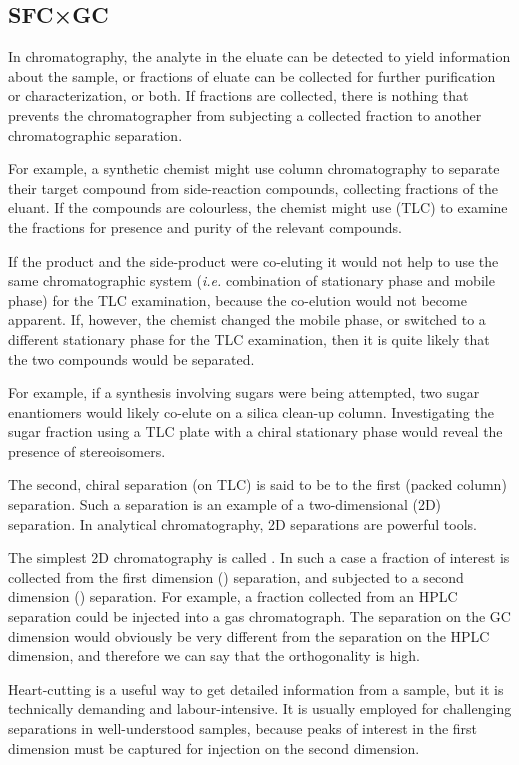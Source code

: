 \subsection{SFC×GC}
\label{sec:SFCxGC}
In chromatography, the analyte in the eluate can be detected to yield
information about the sample, or fractions of eluate can be collected for
further purification or characterization, or both. If fractions are collected,
there is nothing that prevents the chromatographer from subjecting a collected
fraction to another chromatographic separation.

For example, a synthetic chemist might use column chromatography to separate
their target compound from side-reaction compounds, collecting fractions of the
eluant. If the compounds are colourless, the chemist might use
 (TLC) to examine the fractions for presence
and purity of the relevant compounds.

If the product and the side-product were co-eluting it would not help to use the
same chromatographic system (\textit{i.e.} combination of stationary phase and
mobile phase) for the TLC examination, because the co-elution would not become
apparent. If, however, the chemist changed the mobile phase, or switched to a
different stationary phase for the TLC examination, then it is quite likely that
the two compounds would be separated. 

For example, if a synthesis involving sugars were being attempted, two sugar
enantiomers would likely co-elute on a silica clean-up column. Investigating the
sugar fraction using a TLC plate with a chiral stationary phase
would reveal the presence of stereoisomers.

The second, chiral separation (on TLC) is said to be  to the
first (packed column) separation. Such a separation is an example of a
two-dimensional (2D) separation. In analytical chromatography, 2D separations
are powerful tools.

The simplest 2D chromatography is called . In such a case
a fraction of interest is collected from the first dimension (\oneD) separation,
and subjected to a second dimension (\twoD) separation. For example, a fraction
collected from an HPLC separation could be injected into a gas chromatograph.
The separation on the GC dimension would obviously be very different from the
separation on the HPLC dimension, and therefore we can say that the
orthogonality is high.

Heart-cutting is a useful way to get detailed information from a sample, but it
is technically demanding and labour-intensive. It is usually employed for
challenging separations in well-understood samples, because peaks of interest
in the first dimension must be captured for injection on the second dimension.

